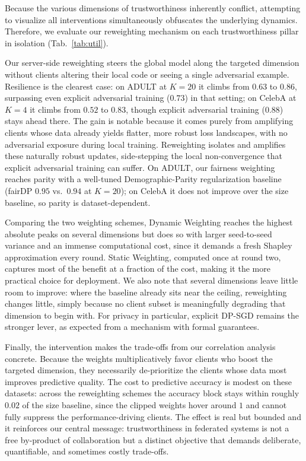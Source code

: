 \documentclass[acmsmall]{acmart}
\begin{document}
Because the various dimensions of trustworthiness inherently conflict, attempting to visualize all interventions simultaneously obfuscates the underlying dynamics. Therefore, we evaluate our reweighting mechanism on each trustworthiness pillar in isolation (Tab.~\ref{tab:util}). 

Our server-side reweighting steers the global model along the targeted dimension without clients altering their local code or seeing a single adversarial example. Resilience is the clearest case: on ADULT at $K=20$ it climbs from $0.63$ to $0.86$, surpassing even explicit adversarial training ($0.73$) in that setting; on CelebA at $K=4$ it climbs from $0.52$ to $0.83$, though explicit adversarial training ($0.88$) stays ahead there. The gain is notable because it comes purely from amplifying clients whose data already yields flatter, more robust loss landscapes, with no adversarial exposure during local training. Reweighting isolates and amplifies these naturally robust updates, side-stepping the local non-convergence that explicit adversarial training can suffer. On ADULT, our fairness weighting reaches parity with a well-tuned Demographic-Parity regularization baseline (fairDP $0.95$ vs.\ $0.94$ at $K=20$); on CelebA it does not improve over the size baseline, so parity is dataset-dependent.

Comparing the two weighting schemes, Dynamic Weighting reaches the highest absolute peaks on several dimensions but does so with larger seed-to-seed variance and an immense computational cost, since it demands a fresh Shapley approximation every round. Static Weighting, computed once at round two, captures most of the benefit at a fraction of the cost, making it the more practical choice for deployment. We also note that several dimensions leave little room to improve: where the baseline already sits near the ceiling, reweighting changes little, simply because no client subset is meaningfully degrading that dimension to begin with. For privacy in particular, explicit DP-SGD remains the stronger lever, as expected from a mechanism with formal guarantees.

Finally, the intervention makes the trade-offs from our correlation analysis concrete. Because the weights multiplicatively favor clients who boost the targeted dimension, they necessarily de-prioritize the clients whose data most improves predictive quality. The cost to predictive accuracy is modest on these datasets: across the reweighting schemes the accuracy block stays within roughly $0.02$ of the size baseline, since the clipped weights hover around $1$ and cannot fully suppress the performance-driving clients. The effect is real but bounded and it reinforces our central message: trustworthiness in federated systems is not a free by-product of collaboration but a distinct objective that demands deliberate, quantifiable, and sometimes costly trade-offs.
\end{document}
